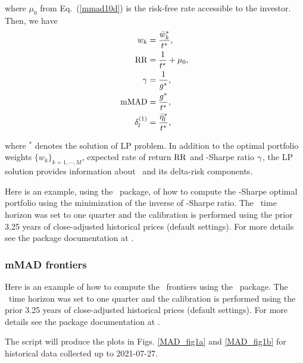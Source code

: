 \noindent where $\mu_0$ from Eq.~(\ref{mmad10d}) is the risk-free rate accessible to the investor.
Then, we have
\begin{subequations}\label{mmad11}
\begin{align}
    w_k &= \frac{\bw_k^*}{t^*} , \label{mmad11a} \\
    \RR &= \frac{1}{t^*} + \mu_0, \label{mmad11b} \\
    \Sharpe &= \frac{1}{g^*}, \label{mmad11c} \\
    \mMAD &= \frac{g^*}{t^*}, \label{mmad11d} \\
    \delta^{(1)}_l &= \frac{\bbeta_l^*}{t^*} , \label{mmad11e}
\end{align}
\end{subequations}

\noindent where $^*$ denotes the solution of LP problem.
In addition to the optimal portfolio weights $\{w_k\}_{k=1,\cdots,M}$, expected rate of return ${\rm RR}$ and
\mMAD-Sharpe ratio ${\gamma}$,
the LP solution provides information about \mMAD\ and its delta-risk components.


\bigskip
\noindent Here is an example, using the \azapy\ package, of how to compute the \mMAD-Sharpe optimal portfolio using the minimization
of the inverse of \mMAD-Sharpe ratio.
The \mMAD\ time horizon was set to one quarter and the calibration is performed using the prior 3.25 years of
close-adjusted historical prices (default settings).
For more details see the package documentation at \azapydoc.



\BackToContents

\subsubsection{mMAD frontiers}

Here is an example of how to compute the \mMAD\ frontiers using the \azapy\
package. The \mMAD\ time horizon was set to one quarter and the calibration is performed using the prior 3.25 years of
close-adjusted historical prices (default settings).
For more details see the package documentation at \azapydoc.

The script will produce the plots in Figs. \ref{MAD_fig1a} and \ref{MAD_fig1b}
for historical data collected up to 2021-07-27.




